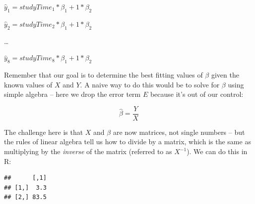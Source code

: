 \documentclass[12pt,]{book}
\newenvironment{Shaded}{\begin{snugshade}}{\end{snugshade}}
\newcommand{\CommentTok}[1]{\textcolor[rgb]{0.56,0.35,0.01}{\textit{#1}}}
\newcommand{\DataTypeTok}[1]{\textcolor[rgb]{0.13,0.29,0.53}{#1}}
\newcommand{\DecValTok}[1]{\textcolor[rgb]{0.00,0.00,0.81}{#1}}
\newcommand{\KeywordTok}[1]{\textcolor[rgb]{0.13,0.29,0.53}{\textbf{#1}}}
\newcommand{\NormalTok}[1]{#1}
\newcommand{\OperatorTok}[1]{\textcolor[rgb]{0.81,0.36,0.00}{\textbf{#1}}}
\newcommand{\StringTok}[1]{\textcolor[rgb]{0.31,0.60,0.02}{#1}}
\theoremstyle{definition}
\theoremstyle{definition}
\theoremstyle{definition}
\theoremstyle{remark}
\begin{document}
\(\hat{y}_1 = studyTime_1*\beta_1 + 1*\beta_2\)

\(\hat{y}_2 = studyTime_2*\beta_1 + 1*\beta_2\)

\ldots{}

\(\hat{y}_8 = studyTime_8*\beta_1 + 1*\beta_2\)

Remember that our goal is to determine the best fitting values of \(\beta\) given the known values of \(X\) and \(Y\). A naive way to do this would be to solve for \(\beta\) using simple algebra -- here we drop the error term \(E\) because it's out of our control:

\[
\hat{\beta} = \frac{Y}{X}
\]

The challenge here is that \(X\) and \(\beta\) are now matrices, not single numbers -- but the rules of linear algebra tell us how to divide by a matrix, which is the same as multiplying by the \emph{inverse} of the matrix (referred to as \(X^{-1}\)). We can do this in R:

\begin{Shaded}
\end{Shaded}

\begin{verbatim}
##      [,1]
## [1,]  3.3
## [2,] 83.5
\end{verbatim}
\end{document}

